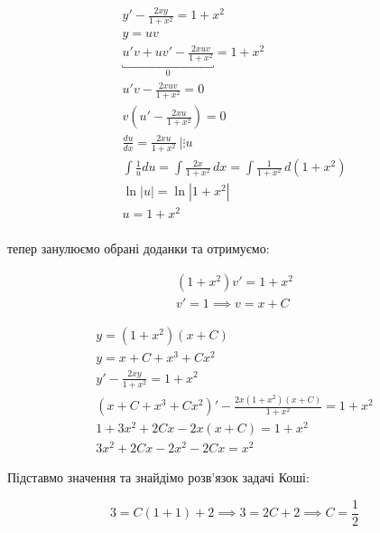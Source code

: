 \documentclass[../rgr_2.tex]{subfiles}
\begin{document}
\Solution

\begin{align}
	y'-\frac{2xy}{1+x^2}=1+x^2 \\
	y = uv \\
	\underbracket{u'v+uv'-\frac{2xuv}{1+x^2}}_0=1+x^2 \\
	u'v-\frac{2xuv}{1+x^2}=0 \\
	v\left(u'-\frac{2xu}{1+x^2}\right)=0 \\ %
	\frac{du}{dx}=\frac{2xu}{1+x^2}~\Big|\vdots u \\
	\int \frac{1}{u} du=\int \frac{2x}{1+x^2}\,dx
	=\int\frac{1}{1+x^2}\,d(1+x^2) \\
	\ln|u|=\ln|1+x^2| \\
	u=1+x^2 \\
\end{align}

тепер занулюємо обрані доданки та отримуємо:

\begin{align}
	(1+x^2)v'=1+x^2 \\
	v'=1 \implies v = x+C
\end{align}


\begin{align}
	y=(1+x^2)(x+C) \\ %
	y=x+C+x^3+Cx^2 \\ %
	y'-\frac{2xy}{1+x^2}=1+x^2 \\
	(x+C+x^3+Cx^2)'-\frac{2x(1+x^2)(x+C)}{1+x^2}=1+x^2 \\
	1+3x^2+2Cx-2x(x+C)=1+x^2 \\
	3x^2+2Cx-2x^2-2Cx=x^2 %
\end{align}

Підставмо значення та знайдімо розв'язок задачі Коші:

\begin{equation}
	3=C(1+1)+2
	\implies 3=2C+2
	\implies C=\frac{1}{2}
\end{equation}

\Answer{
	<++>
}
\end{document}
